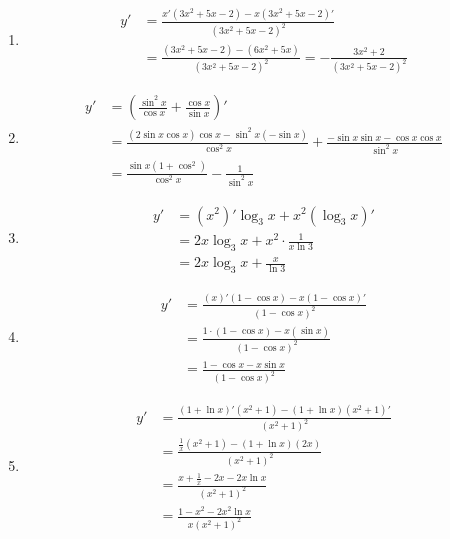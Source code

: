 \begin{solution}
    \begin{enumerate}
        \item \begin{align*}
                  y' & = \frac{x' (3x^2+5x-2) - x (3x^2+5x-2)'}{(3x^2+5x-2)^2}                     \\
                     & =\frac{(3x^2+5x-2)-(6x^2+5x)}{(3x^2+5x-2)^2}=- \frac{3x^2+2}{(3x^2+5x-2)^2}
              \end{align*}
        \item \begin{align*}
                  y' & = \left(\frac{\sin^2 x}{\cos x} + \frac{\cos x}{\sin x} \right)'                                                \\
                     & =\frac{(2\sin x \cos x)\cos x - \sin^2 x (-\sin x)}{\cos^2 x} + \frac{-\sin x \sin x - \cos x \cos x}{\sin^2 x} \\
                     & =\frac{\sin x(1+\cos^2)}{\cos^2 x}- \frac{1}{\sin^2 x}
              \end{align*}
        \item \begin{align*}
                  y' & = (x^2)' \log_3 x + x^2 (\log_3 x)'         \\
                     & = 2x \log_3 x + x^2 \cdot \frac{1}{x \ln 3} \\
                     & = 2x \log_3 x + \frac{x}{\ln 3}
              \end{align*}
        \item \begin{align*}
                  y' & = \frac{(x)' (1-\cos x) - x (1-\cos x)'}{(1-\cos x)^2} \\
                     & = \frac{1 \cdot (1-\cos x) - x (\sin x)}{(1-\cos x)^2} \\
                     & = \frac{1-\cos x - x \sin x}{(1-\cos x)^2}
              \end{align*}
        \item \begin{align*}
                  y' & = \frac{(1+\ln x)'(x^2+1) - (1+\ln x)(x^2+1)'}{(x^2+1)^2} \\
                     & = \frac{\frac{1}{x}(x^2+1) - (1+\ln x)(2x)}{(x^2+1)^2}    \\
                     & = \frac{x+\frac{1}{x} - 2x - 2x \ln x}{(x^2+1)^2}         \\
                     & = \frac{1-x^2-2x^2\ln x}{x(x^2+1)^2}

\end{align*}
\end{enumerate}
\end{solution}
